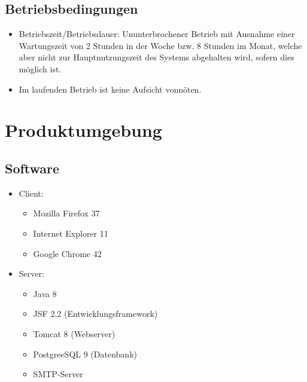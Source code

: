 \documentclass[a4paper]{scrreprt}
\begin{document}
    
	\section{Betriebsbedingungen}
	       \begin{itemize}
		       	\item Betriebszeit/Betriebsdauer: Ununterbrochener Betrieb mit Ausnahme einer Wartungszeit von 2 Stunden in der Woche bzw. 8 Stunden im Monat, welche aber nicht zur Hauptnutzungszeit des Systems abgehalten wird, sofern dies möglich ist.
		       	\item  Im laufenden Betrieb ist keine Aufsicht vonnöten.
	       \end{itemize}
	
			
 
\chapter{Produktumgebung}
	\section{Software}
        \begin{itemize}
      		\item \gls{Client}:
	      		\begin{itemize}
	      			\item Mozilla Firefox 37
	      			\item Internet Explorer 11
	      			\item Google Chrome 42
	      		\end{itemize}
          	\item \gls{Server}:
	            \begin{itemize}
	            	\item Java 8
	            	\item \gls{JSF} 2.2 (Entwicklungsframework)
	            	\item \gls{Tomcat} 8 (Webserver)
	            	\item \gls{PostgreeSQL} 9 (Datenbank)  
	            	\item \gls{SMTP-Server}
	            \end{itemize}
        \end{itemize}
        
\end{document}
